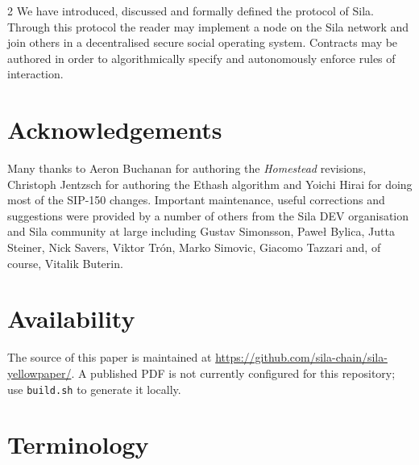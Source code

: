 \documentclass[9pt,oneside]{amsart}
\begin{document}
\begin{multicols}{2}
We have introduced, discussed and formally defined the protocol of Sila. Through this protocol the reader may implement a node on the Sila network and join others in a decentralised secure social operating system. Contracts may be authored in order to algorithmically specify and autonomously enforce rules of interaction.

\section{Acknowledgements}

Many thanks to Aeron Buchanan for authoring the \textit{Homestead} revisions, Christoph Jentzsch for authoring the Ethash algorithm and Yoichi Hirai for doing most of the SIP-150 changes. Important maintenance, useful corrections and suggestions were provided by a number of others from the Sila DEV organisation and Sila community at large including Gustav Simonsson, Pawe\l{} Bylica, Jutta Steiner, Nick Savers, Viktor Tr\'{o}n, Marko Simovic, Giacomo Tazzari and, of course, Vitalik Buterin.

\section{Availability}

The source of this paper is maintained at \url{https://github.com/sila-chain/sila-yellowpaper/}. A published PDF is not currently configured for this repository; use \texttt{build.sh} to generate it locally.




\end{multicols}

\appendix

\section{Terminology} \label{ch:Terminology}
\end{document}
